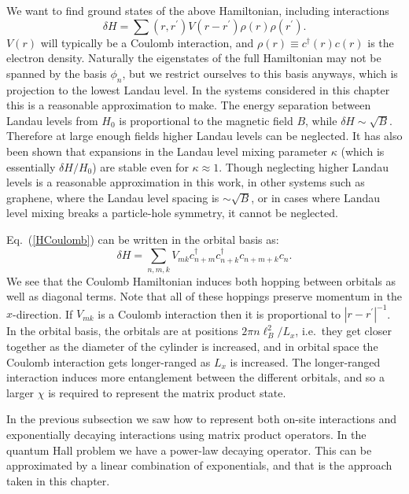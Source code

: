 We want to find ground states of the above Hamiltonian, including interactions
\begin{equation}
\delta H=\sum(r,r^\prime) V(r-r^\prime) \rho(r)\rho(r^\prime).
\label{HCoulomb}
\end{equation}
$V(r)$ will typically be a Coulomb interaction, and $\rho(r)\equiv c^\dagger(r)c(r)$ is the electron density. Naturally the eigenstates of the full Hamiltonian may not be spanned by the basis $\phi_n$, but we restrict ourselves to this basis anyways, which is projection to the lowest Landau level. In the systems considered in this chapter this is a reasonable approximation to make. The energy separation between Landau levels from $H_0$ is proportional to the magnetic field $B$, while $\delta H\sim\sqrt{B}$. Therefore at large enough fields higher Landau levels can be neglected. It has also been shown that expansions in the Landau level mixing parameter $\kappa$ (which is essentially $\delta H/H_0$) are stable even for $\kappa\approx1$. Though neglecting higher Landau levels is a reasonable approximation in this work, in other systems such as graphene, where the Landau level spacing is $\sim\sqrt{B}$, or in cases where Landau level mixing breaks a particle-hole symmetry, it cannot be neglected.

Eq.~(\ref{HCoulomb}) can be written in the orbital basis as: 
\begin{equation}
\delta H=\sum_{n,m,k} V_{mk} c^{\dagger}_{n+m} c_{n+k}^{\dagger} c_{n+m+k} c_{n}.
\end{equation}
We see that the Coulomb Hamiltonian induces both hopping between orbitals as well as diagonal terms. Note that all of these hoppings preserve momentum in the $x$-direction. If $V_{mk}$ is a Coulomb interaction then it is proportional to $|r-r^\prime|^{-1}$. In the orbital basis, the orbitals are at positions $2\pi n \ell_B^2/L_x$, i.e.~they get closer together as the diameter of the cylinder is increased, and in orbital space the Coulomb interaction gets longer-ranged as $L_x$ is increased. The longer-ranged interaction induces more entanglement between the different orbitals, and so a larger $\chi$ is required to represent the matrix product state. 

In the previous subsection we saw how to represent both on-site interactions and exponentially decaying interactions using matrix product operators. In the quantum Hall problem we have a power-law decaying operator. This can be approximated by a linear combination of exponentials, and that is the approach taken in this chapter\cite{ZaletelQHdmrg13}. 

